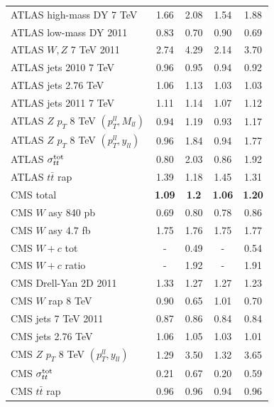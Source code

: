 \begin{table}[h]
\begin{center}
\begin{tabular}{|l|c|c||c|c|}
  ATLAS high-mass DY 7 TeV      &   1.66     &   2.08
   &    1.54     &   1.88  \\
  ATLAS low-mass DY 2011      &   0.83      &   0.70
  &    0.90      &   0.69 \\
  ATLAS $W,Z$ 7 TeV 2011       &   2.74      &   4.29
   &    2.14     &   3.70  \\
ATLAS jets 2010 7 TeV       &   0.96      &   0.95  &    0.94      &   0.92  \\
ATLAS jets 2.76 TeV       &   1.06      &   1.13   &    1.03      &   1.03  \\
ATLAS jets 2011 7 TeV       &   1.11     &   1.14   &    1.07     &   1.12  \\
ATLAS $Z$ $p_T$ 8 TeV $(p_T^{ll},M_{ll})$          &   0.94     &   1.19
&    0.93    &   1.17 \\
ATLAS $Z$ $p_T$ 8 TeV $(p_T^{ll},y_{ll})$      &   0.96      &   1.84
 &    0.94      &   1.77 \\
ATLAS $\sigma_{tt}^{\rm tot}$       &   0.80      &   2.03  &    0.86      &   1.92  \\
ATLAS $t\bar{t}$ rap      &   1.39     &   1.18  &    1.45     &   1.31  \\
\hline
CMS total     &   {\bf 1.09}     &   {\bf 1.2}
&    {\bf  1.06}    &   {\bf 1.20 } \\
CMS $W$ asy 840 pb       &   0.69     &   0.80  &    0.78     &   0.86  \\
CMS $W$ asy 4.7 fb        &   1.75      &   1.76
 &    1.75     &   1.77\\
CMS $W+c$ tot      &   -     &   0.49  &    -     &   0.54 \\
CMS $W+c$ ratio       &   -     &   1.92   &    -      &   1.91 \\
CMS Drell-Yan 2D 2011       &   1.33      &   1.27
 &    1.27     &   1.23  \\
CMS $W$ rap 8 TeV       &   0.90      &   0.65 &    1.01      &   0.70    \\
CMS jets 7 TeV 2011       &   0.87      &   0.86
&    0.84      &   0.84  \\
CMS jets 2.76 TeV       &   1.06      &   1.05  &    1.03      &   1.01  \\
CMS $Z$ $p_T$ 8 TeV $(p_T^{ll},y_{ll})$      &   1.29      &   3.50
 &    1.32    &   3.65 \\
CMS $\sigma_{tt}^{\rm tot}$        &   0.21      &   0.67  &    0.20      &   0.59  \\
CMS $t\bar{t}$ rap       &   0.96      &   0.96
&    0.94      &   0.96 \\

\end{tabular}
\end{center}
\end{table}
